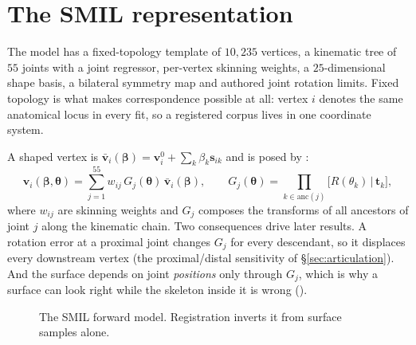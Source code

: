\section{The SMIL representation}
\label{sec:representation}

The model has a fixed-topology template of $10{,}235$ vertices, a kinematic
tree of $55$ joints with a joint regressor, per-vertex skinning weights, a
$25$-dimensional shape basis, a bilateral symmetry map and authored joint
rotation limits. Fixed topology is what makes correspondence possible at all:
vertex $i$ denotes the same anatomical locus in every fit, so a registered
corpus lives in one coordinate system.

A shaped vertex is $\bar{\mathbf v}_i(\bm\beta)=\mathbf v^{0}_i+\sum_k\beta_k\mathbf s_{ik}$
and is posed by :
\begin{equation}
\mathbf v_i(\bm\beta,\bm\theta)=\sum_{j=1}^{55} w_{ij}\,G_j(\bm\theta)\,\bar{\mathbf v}_i(\bm\beta),
\qquad G_j(\bm\theta)=\prod_{k\in\mathrm{anc}(j)}\big[R(\theta_k)\,|\,\mathbf t_k\big],
\label{eq:lbs}
\end{equation}
where $w_{ij}$ are skinning weights and $G_j$ composes the transforms of all
ancestors of joint $j$ along the kinematic chain. Two consequences drive
later results. A rotation error at a proximal joint changes $G_j$ for every
descendant, so it displaces every downstream vertex (the proximal/distal
sensitivity of \S\ref{sec:articulation}). And the surface depends on joint
\emph{positions} only through $G_j$, which is why a surface can look right
while the skeleton inside it is wrong ().

\begin{figure}[!htb]
\centering
{}
\caption{The SMIL forward model. Registration inverts it from surface samples
alone.}
\label{fig:forward-model}
\end{figure}

